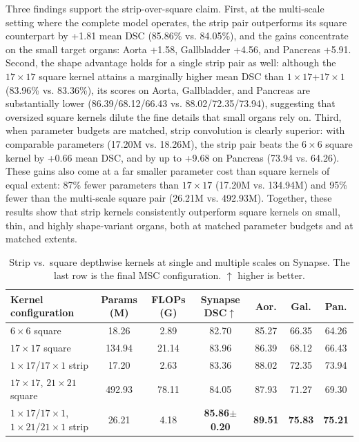 \documentclass{llncs}
\begin{document}
Three findings support the strip-over-square claim. First, at the multi-scale setting where the complete model operates, the strip pair outperforms its square counterpart by +1.81 mean DSC (85.86\% vs. 84.05\%), and the gains concentrate on the small target organs: Aorta +1.58, Gallbladder +4.56, and Pancreas +5.91. Second, the shape advantage holds for a single strip pair as well: although the $17\times17$ square kernel attains a marginally higher mean DSC than $1\times17$+$17\times1$ (83.96\% vs. 83.36\%), its scores on Aorta, Gallbladder, and Pancreas are substantially lower (86.39/68.12/66.43 vs. 88.02/72.35/73.94), suggesting that oversized square kernels dilute the fine details that small organs rely on. Third, when parameter budgets are matched, strip convolution is clearly superior: with comparable parameters (17.20M vs. 18.26M), the strip pair beats the $6\times6$ square kernel by +0.66 mean DSC, and by up to +9.68 on Pancreas (73.94 vs. 64.26). These gains also come at a far smaller parameter cost than square kernels of equal extent: 87\% fewer parameters than $17\times17$ (17.20M vs. 134.94M) and 95\% fewer than the multi-scale square pair (26.21M vs. 492.93M). Together, these results show that strip kernels consistently outperform square kernels on small, thin, and highly shape-variant organs, both at matched parameter budgets and at matched extents.

\begin{table}[!htbp]
\centering
\footnotesize
\caption{Strip vs.\ square depthwise kernels at single and multiple scales on Synapse. The last row is the final MSC configuration. $\uparrow$ higher is better.}
\label{table_strip_square}
\begin{tabular}{l|cc|c|ccc}
\hline
Kernel configuration & Params (M) & FLOPs (G) & Synapse DSC$\uparrow$ & Aor. & Gal. & Pan. \\
\hline
$6\times6$ square                                    & 18.26  & 2.89  & 82.70 & 85.27 & 66.35 & 64.26 \\
$17\times17$ square                                  & 134.94 & 21.14 & 83.96 & 86.39 & 68.12 & 66.43 \\
$1\times17$/$17\times1$ strip                        & 17.20  & 2.63  & 83.36 & 88.02 & 72.35 & 73.94 \\
$17\times17$, $21\times21$ square                    & 492.93 & 78.11 & 84.05 & 87.93 & 71.27 & 69.30 \\
$1\times17$/$17\times1$, $1\times21$/$21\times1$ strip & 26.21  & 4.18  & \textbf{85.86$\pm$0.20} & \textbf{89.51} & \textbf{75.83} & \textbf{75.21} \\
\hline
\end{tabular}
\end{table}
\end{document}
